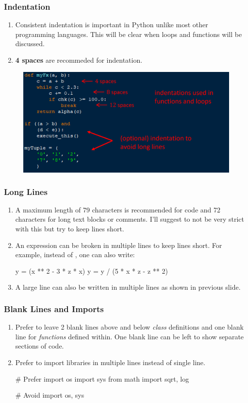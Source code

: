 \documentclass{beamer}
\begin{document}
\begin{frame}
\frametitle{Indentation}
\begin{enumerate}
\item Consistent indentation is important in Python unlike most other programming languages. This will be clear when loops and functions will be discussed.
\item \textbf{4 spaces} are recommeded for indentation.
\end{enumerate}
\begin{figure}[H]
\centering
\includegraphics[width=\textwidth]{images/0_indentation.png}
\end{figure}
\end{frame}

\begin{frame}[fragile]
\frametitle{Long Lines}
\begin{enumerate}
\item A maximum length of 79 characters is recommended for code and 72 characters for long text blocks or comments. I'll suggest to not be very strict with this but try to keep lines short.
\item An expression can be broken in multiple lines to keep lines short. For example, instead of , one can also write:
\begin{python}
y = (x ** 2 - 3 * z * x)
y = y / (5 * x * z - z ** 2)
\end{python}
\item A large line can also be written in multiple lines as shown in previous slide.
\end{enumerate}
\end{frame}

\begin{frame}[fragile]
\frametitle{Blank Lines and Imports}
\begin{enumerate}
\item Prefer to leave 2 blank lines above and below \emph{class} definitions and one blank line for \emph{functions} defined within. One blank line can be left to show separate sections of code.
\item Prefer to import libraries in multiple lines instead of single line.
\begin{python}
# Prefer
import os
import sys
from math import sqrt, log

# Avoid
import os, sys
\end{python}
\end{enumerate}
\end{frame}
\end{document}
